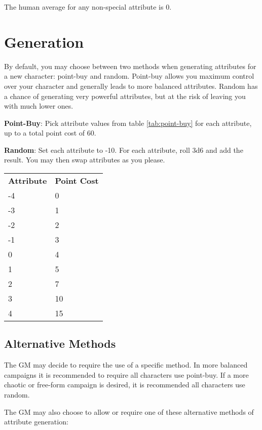 \begin{multicols*}{2}
    The human average for any non-special attribute is 0.

    \section{Generation}
    By default, you may choose between two methods when generating attributes
    for a new character: point-buy and random. Point-buy allows you maximum
    control over your character and generally leads to more balanced
    attributes. Random has a chance of generating very powerful attributes, but
    at the risk of leaving you with much lower ones.
    
    \textbf{Point-Buy}: Pick attribute values from table \ref{tab:point-buy}
    for each attribute, up to a total point cost of 60.

    \textbf{Random}: Set each attribute to -10. For each attribute, roll 3d6
    and add the result. You may then swap attributes as you please.

    {
        \setlength\parindent{0pt}
        \unclassedrowcolors
        \begin{tabularx}{0.5\textwidth}{l X}
            \textbf{Attribute} & \textbf{Point Cost} \\
            -4 & 0 \\
            -3 & 1 \\
            -2 & 2 \\
            -1 & 3 \\
            0 & 4 \\
            1 & 5 \\
            2 & 7 \\
            3 & 10 \\
            4 & 15 \\
        \end{tabularx}
        \label{tab:point-buy}
    }

    \subsection{Alternative Methods}
    The GM may decide to require the use of a specific method. In more balanced
    campaigns it is recommended to require all characters use point-buy. If a
    more chaotic or free-form campaign is desired, it is recommended all
    characters use random.

    The GM may also choose to allow or require  one of these alternative
    methods of attribute generation:
    

\end{multicols*}

